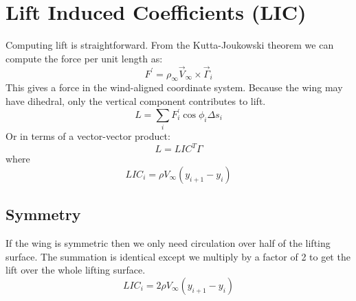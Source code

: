 \documentclass{article}
\begin{document}
\section{Lift Induced Coefficients (LIC)}
Computing lift is straightforward.  From the Kutta-Joukowski theorem we can compute the force per unit length as:
\begin{equation}
F^\prime = \rho_\infty \vec V_\infty \times \vec \Gamma_i
\end{equation}
This gives a force in the wind-aligned coordinate system.  Because the wing may have dihedral, only the vertical component contributes to lift.
\begin{equation}
L = \sum_i F^\prime_i \cos\phi_i \Delta s_i
\end{equation}
Or in terms of a vector-vector product:
\begin{equation}
L = LIC^T \Gamma
\end{equation}
where
\begin{equation}
LIC_i = \rho V_\infty (y_{i+1} - y_i)
\end{equation}

\subsection{Symmetry}
If the wing is symmetric then we only need circulation over half of the lifting surface.  The summation is identical except we multiply by a factor of 2 to get the lift over the whole lifting surface.
\begin{equation}
LIC_i = 2 \rho V_\infty (y_{i+1} - y_i)
\end{equation}
\end{document}
